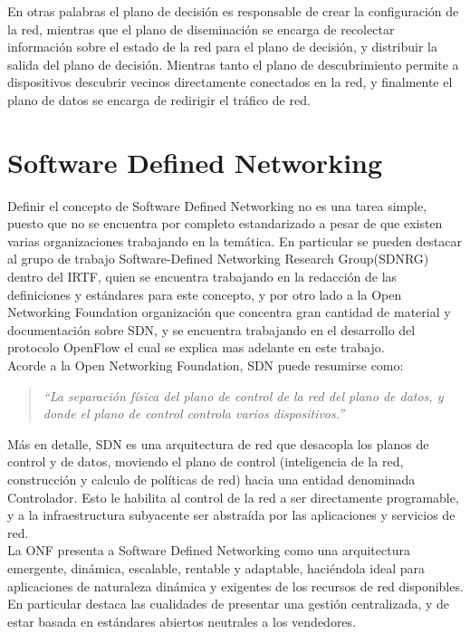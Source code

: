 En otras palabras el plano de decisión es responsable de crear la configuración de la red, mientras que el plano de diseminación se encarga de recolectar información sobre el estado de la red para el plano de decisión, y distribuir la salida del plano de decisión. Mientras tanto el plano de descubrimiento permite a dispositivos descubrir vecinos directamente conectados en la red, y finalmente el plano de datos se encarga de redirigir el tráfico de red.\\

\section{Software Defined Networking}
\label{section2.2}

Definir el concepto de Software Defined Networking no es una tarea simple, puesto que no se encuentra por completo estandarizado a pesar de que existen varias organizaciones trabajando en la temática. En particular se pueden destacar al grupo de trabajo Software-Defined Networking Research Group(SDNRG) dentro del IRTF, quien se encuentra trabajando en la redacción de las definiciones y estándares para este concepto, y por otro lado a la Open Networking Foundation organización que concentra gran cantidad de material y documentación sobre SDN, y se encuentra trabajando en el desarrollo del protocolo OpenFlow el cual se explica mas adelante en este trabajo.\\

Acorde a la Open Networking Foundation, SDN puede resumirse como:

\begin{quote}
\textit{``La separación física del plano de control de la red del plano de datos, y donde el plano de control controla varios dispositivos.''}
\end{quote}

Más en detalle, SDN es una arquitectura de red que desacopla los planos de control y de datos, moviendo el plano de control (inteligencia de la red, construcción y calculo de políticas de red) hacia una entidad denominada Controlador. Esto le habilita al control de la red a ser directamente programable, y a la infraestructura subyacente ser abstraída por las aplicaciones y servicios de red.\\ 

La ONF presenta a Software Defined Networking como una arquitectura emergente, dinámica, escalable, rentable y adaptable, haciéndola ideal para aplicaciones de naturaleza dinámica y exigentes de los recursos de red disponibles. En particular destaca las cualidades de presentar una gestión centralizada, y de estar basada en estándares abiertos neutrales a los vendedores.\\


